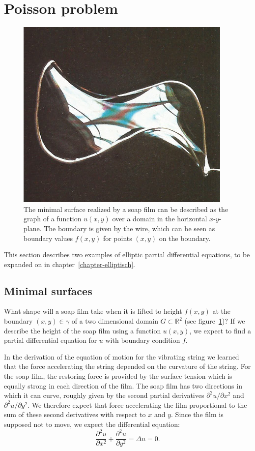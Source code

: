 %
%
%
\section{Poisson problem}
\label{poisson-problem}
\begin{figure}
\centering
\includegraphics[width=0.4\hsize]{1-examples/images/minimum-area-surface.jpg}
\caption{The minimal surface realized by a soap film can be described as
the graph of a function $u(x,y)$ over a domain in the horizontal $x$-$y$-plane.
The boundary is given by the wire, which can be seen as boundary values
$f(x,y)$ for points $(x,y)$ on the boundary.
\label{examples:minimal-surface-image}}
\end{figure}
This section describes two examples of elliptic partial differential
equations, to be expanded on in chapter~\ref{chapter-elliptisch}.

\subsection{Minimal surfaces\label{beispiele:minimal surfaces}}
What shape will a soap film take when it is lifted to height
$f(x,y)$ at the boundary $(x,y)\in\gamma$ of 
a two dimensional domain $G\subset \mathbb R^2$
(see figure~\ref{examples:minimal-surface-image})?
If we describe the height of the soap film using a function
$u(x,y)$, we expect to find a partial differential equation for $u$
with boundary condition $f$.

In the derivation of the equation of motion for the vibrating string
we learned that the force accelerating the string depended on the
curvature of the string.
For the soap film, the restoring force is provided by the surface
tension which is equally strong in each direction of the film.
The soap film has two directions in which it can curve, roughly
given by the second partial derivatives $\partial^2 u/\partial x^2$ and
$\partial^2 u/\partial y^2$.
We therefore expect that force accelerating the film proportional
to the sum of these second derivatives with respect to $x$ and $y$.
Since the film is supposed not to move, we expect the differential
equation:
\[
\frac{\partial^2 u }{\partial x^2}+\frac{\partial^2 u }{\partial y^2}
=\Delta u =0.
\]

